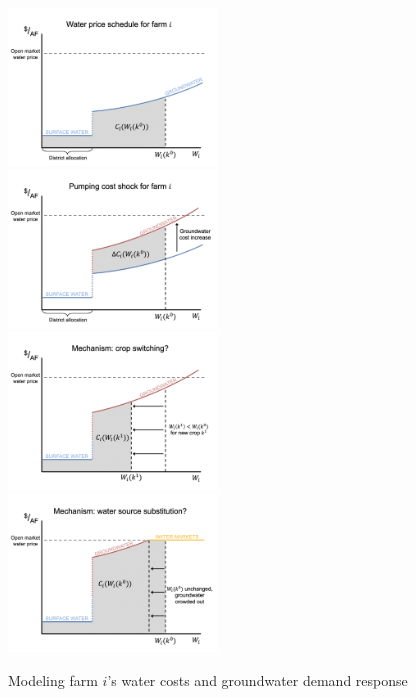 
\begin{figure}[t]
\begin{centering}
\caption{Modeling farm $i$'s water costs and groundwater demand response}
\label{fig:water_cost_cartoons}
\includegraphics[width=0.495\textwidth, trim={4mm 0 11mm 0mm}, clip]{Figures/water_cost_1.png}
\includegraphics[width=0.495\textwidth, trim={4mm 0 11mm 0mm}, clip]{Figures/water_cost_2.png} \\
\includegraphics[width=0.495\textwidth, trim={4mm 0 11mm 0mm}, clip]{Figures/water_cost_3.png}
\includegraphics[width=0.495\textwidth, trim={4mm 0 11mm 0mm}, clip]{Figures/water_cost_4.png}

\end{centering}
\end{figure}
